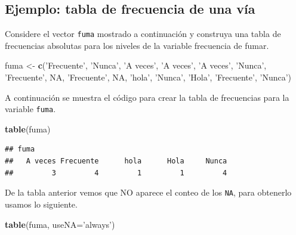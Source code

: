 \documentclass[10pt,]{krantz}
\makeatletter
\newenvironment{Shaded}{\begin{snugshade}}{\end{snugshade}}
\newcommand{\KeywordTok}[1]{\textcolor[rgb]{0.13,0.29,0.53}{\textbf{{#1}}}}
\newcommand{\DataTypeTok}[1]{\textcolor[rgb]{0.13,0.29,0.53}{{#1}}}
\newcommand{\StringTok}[1]{\textcolor[rgb]{0.31,0.60,0.02}{{#1}}}
\newcommand{\OtherTok}[1]{\textcolor[rgb]{0.56,0.35,0.01}{{#1}}}
\newcommand{\NormalTok}[1]{{#1}}
\newenvironment{kframe}{%
\medskip{}
\setlength{\fboxsep}{.8em}
 \def\at@end@of@kframe{}%
 \ifinner\ifhmode%
  \def\at@end@of@kframe{\end{minipage}}%
  \begin{minipage}{\columnwidth}%
 \fi\fi%
 \def\FrameCommand##1{\hskip\@totalleftmargin \hskip-\fboxsep
 \colorbox{shadecolor}{##1}\hskip-\fboxsep
     \hskip-\linewidth \hskip-\@totalleftmargin \hskip\columnwidth}%
 \MakeFramed {\advance\hsize-\width
   \@totalleftmargin\z@ \linewidth\hsize
   \@setminipage}}%
 {\par\unskip\endMakeFramed%
 \at@end@of@kframe}
\renewenvironment{Shaded}{\begin{kframe}}{\end{kframe}}
\makeatother
\begin{document}
\subsection*{Ejemplo: tabla de frecuencia de una
vía}\label{ejemplo-tabla-de-frecuencia-de-una-via}

Considere el vector \texttt{fuma} mostrado a continuación y construya
una tabla de frecuencias absolutas para los niveles de la variable
frecuencia de fumar.

\begin{Shaded}
\begin{Highlighting}[]
\NormalTok{fuma <-}\StringTok{ }\KeywordTok{c}\NormalTok{(}\StringTok{'Frecuente'}\NormalTok{, }\StringTok{'Nunca'}\NormalTok{, }\StringTok{'A veces'}\NormalTok{, }\StringTok{'A veces'}\NormalTok{, }\StringTok{'A veces'}\NormalTok{,}
          \StringTok{'Nunca'}\NormalTok{, }\StringTok{'Frecuente'}\NormalTok{, }\OtherTok{NA}\NormalTok{, }\StringTok{'Frecuente'}\NormalTok{, }\OtherTok{NA}\NormalTok{, }\StringTok{'hola'}\NormalTok{, }
          \StringTok{'Nunca'}\NormalTok{, }\StringTok{'Hola'}\NormalTok{, }\StringTok{'Frecuente'}\NormalTok{, }\StringTok{'Nunca'}\NormalTok{)}
\end{Highlighting}
\end{Shaded}

A continuación se muestra el código para crear la tabla de frecuencias
para la variable \texttt{fuma}.

\begin{Shaded}
\begin{Highlighting}[]
\KeywordTok{table}\NormalTok{(fuma)}
\end{Highlighting}
\end{Shaded}

\begin{verbatim}
## fuma
##   A veces Frecuente      hola      Hola     Nunca 
##         3         4         1         1         4
\end{verbatim}

De la tabla anterior vemos que NO aparece el conteo de los \texttt{NA},
para obtenerlo usamos lo siguiente.

\begin{Shaded}
\begin{Highlighting}[]
\KeywordTok{table}\NormalTok{(fuma, }\DataTypeTok{useNA=}\StringTok{'always'}\NormalTok{)}
\end{Highlighting}
\end{Shaded}
\end{document}
